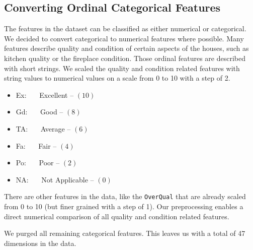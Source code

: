 \subsection{Converting Ordinal Categorical Features}

The features in the dataset can be classified as either numerical or categorical. We decided to convert categorical to numerical features where possible. Many features describe quality and condition of certain aspects of the houses, such as kitchen quality or the fireplace condition. Those ordinal features are described with short strings. We scaled the quality and condition related features with string values to numerical values on a scale from 0 to 10 with a step of 2.

\begin{itemize}
    \item Ex:~~~ Excellent -- $(10)$
    \item Gd:~~~ Good -- $(8)$
    \item TA:~~~ Average -- $(6)$
    \item Fa:~~~ Fair -- $(4)$
    \item Po:~~~ Poor -- $(2)$
    \item NA:~~~ Not Applicable -- $(0)$
\end{itemize}

There are other features in the data, like the \texttt{OverQual} that are already scaled from 0 to 10 (but finer grained with a step of 1). Our preprocessing enables a direct numerical comparison of all quality and condition related features.

We purged all remaining categorical features. This leaves us with a total of 47 dimensions in the data.